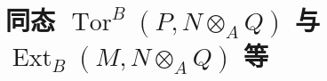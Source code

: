 \section{同态 \texorpdfstring{$\operatorname{Tor}^{B}(P,N\otimes_{A}Q)$}{TorB(P,N@Q)} 与 \texorpdfstring{$\operatorname{Ext}_{B}(M,N\otimes_{A}Q)$}{ExtB(M,N@Q)} 等}
